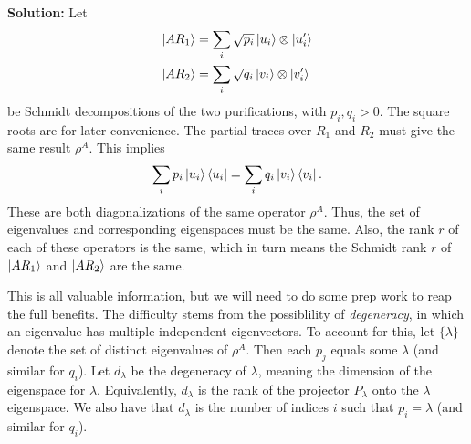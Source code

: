 \documentclass{book}
\begin{document}
    \textbf{Solution:} Let
    \begin{align}
    \begin{aligned}
        \ket{A R_1} &= \sum_i \sqrt{p_i} \ket{u_i}\otimes \ket{u_i'} \\
        \ket{A R_2} &= \sum_i \sqrt{q_i} \ket{v_i}\otimes \ket{v_i'}
    \end{aligned}
    \end{align}
    be Schmidt decompositions of the two purifications, with $p_i, q_i > 0$. The square roots are for later convenience. The partial traces over $R_1$ and $R_2$ must give the same result $\rho^A$. This implies
    \begin{align}
        \sum_i p_i \ket{u_i}\bra{u_i} = \sum_i q_i \ket{v_i}\bra{v_i}.
    \end{align}
    These are both diagonalizations of the same operator $\rho^A$. Thus, the set of eigenvalues and corresponding eigenspaces must be the same. Also, the rank $r$ of each of these operators is the same, which in turn means the Schmidt rank $r$ of $\ket{AR_1}$ and $\ket{AR_2}$ are the same.
    
    This is all valuable information, but we will need to do some prep work to reap the full benefits. The difficulty stems from the possiblility of \emph{degeneracy}, in which an eigenvalue has multiple independent eigenvectors. To account for this, let $\{\lambda\}$ denote the set of distinct eigenvalues of $\rho^A$. Then each $p_j$ equals some $\lambda$ (and similar for $q_i$). Let $d_{\lambda}$ be the degeneracy of $\lambda$, meaning the dimension of the eigenspace for $\lambda$. Equivalently, $d_\lambda$ is the rank of the projector $P_\lambda$ onto the $\lambda$ eigenspace. We also have that $d_\lambda$ is the number of indices $i$ such that $p_i = \lambda$ (and similar for $q_i$).
\end{document}
